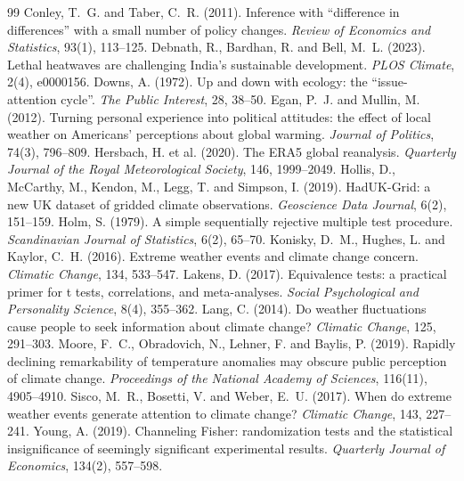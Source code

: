 \documentclass[11pt,a4paper]{article}
\begin{document}
\begin{thebibliography}{99}
\setlength{\itemsep}{2pt}\small
{} Conley, T.~G. and Taber, C.~R. (2011). Inference with ``difference in differences'' with a small number of policy changes. \emph{Review of Economics and Statistics}, 93(1), 113--125.
 Debnath, R., Bardhan, R. and Bell, M.~L. (2023). Lethal heatwaves are challenging India's sustainable development. \emph{PLOS Climate}, 2(4), e0000156.
 Downs, A. (1972). Up and down with ecology: the ``issue-attention cycle''. \emph{The Public Interest}, 28, 38--50.
 Egan, P.~J. and Mullin, M. (2012). Turning personal experience into political attitudes: the effect of local weather on Americans' perceptions about global warming. \emph{Journal of Politics}, 74(3), 796--809.
 Hersbach, H. et al. (2020). The ERA5 global reanalysis. \emph{Quarterly Journal of the Royal Meteorological Society}, 146, 1999--2049.
 Hollis, D., McCarthy, M., Kendon, M., Legg, T. and Simpson, I. (2019). HadUK-Grid: a new UK dataset of gridded climate observations. \emph{Geoscience Data Journal}, 6(2), 151--159.
 Holm, S. (1979). A simple sequentially rejective multiple test procedure. \emph{Scandinavian Journal of Statistics}, 6(2), 65--70.
 Konisky, D.~M., Hughes, L. and Kaylor, C.~H. (2016). Extreme weather events and climate change concern. \emph{Climatic Change}, 134, 533--547.
 Lakens, D. (2017). Equivalence tests: a practical primer for t tests, correlations, and meta-analyses. \emph{Social Psychological and Personality Science}, 8(4), 355--362.
 Lang, C. (2014). Do weather fluctuations cause people to seek information about climate change? \emph{Climatic Change}, 125, 291--303.
 Moore, F.~C., Obradovich, N., Lehner, F. and Baylis, P. (2019). Rapidly declining remarkability of temperature anomalies may obscure public perception of climate change. \emph{Proceedings of the National Academy of Sciences}, 116(11), 4905--4910.
 Sisco, M.~R., Bosetti, V. and Weber, E.~U. (2017). When do extreme weather events generate attention to climate change? \emph{Climatic Change}, 143, 227--241.
 Young, A. (2019). Channeling Fisher: randomization tests and the statistical insignificance of seemingly significant experimental results. \emph{Quarterly Journal of Economics}, 134(2), 557--598.
\end{thebibliography}
\end{document}
